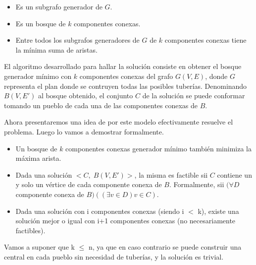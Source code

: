 \begin{itemize}
  \item Es un subgrafo generador de $G$.

  \item Es un bosque de $k$ componentes conexas.

  \item Entre todos los subgrafos generadores de $G$ de $k$ componentes conexas tiene la mínima suma de aristas.
\end{itemize}

El algoritmo desarrollado para hallar la solución consiste en obtener el bosque generador mínimo con $k$ componentes conexas del grafo $G(V,E)$, donde $G$ representa el plan donde se contruyen todas las posibles tuberías. Denominando $B(V,E')$ al bosque obtenido, el conjunto $C$ de la solución se puede conformar tomando un pueblo de cada una de las componentes conexas de $B$.

Ahora presentaremos una idea de por este modelo efectivamente resuelve el problema. Luego lo vamos a demostrar formalmente. 

\begin{itemize}
\item Un bosque de $k$ componentes conexas generador mínimo también minimiza la máxima arista.

\item Dada una solución $<C,\;B(V,E')>$, la misma es factible sii $C$ contiene un y solo un vértice de cada componente conexa de $B$. Formalmente, sii $(\forall D$ componente conexa de $B)((\exists v \in D) v \in C)$.  

\item Dada una solución con i componentes conexas (siendo i $<$ k), existe una solución mejor o igual con i+1 componentes conexas (no necesariamente factibles).
\end{itemize}

Vamos a suponer que k $\leq$ n, ya que en caso contrario se puede construir una central en cada pueblo sin necesidad de tuberías, y la solución es trivial.